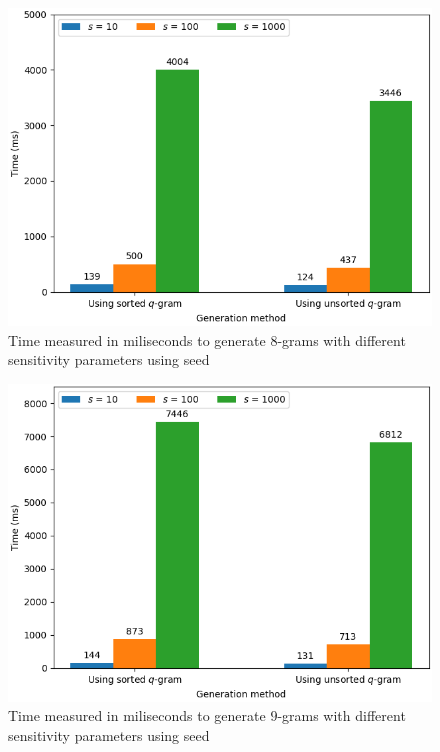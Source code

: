 \documentclass[twoside,a4paper,bsc]{master}
\newcommand{\Qgram}[1]{\(#1\)-gram}
\begin{document}
\begin{figure}
\centering
\includegraphics[scale=0.7]{graphics/gen_w8.png}
\caption{Time measured in miliseconds to generate \Qgram{8}s with
different sensitivity parameters using seed }
\label{fig:speed8}
\end{figure}

\begin{figure}
\centering
\includegraphics[scale=0.7]{graphics/gen_w9.png}
\caption{Time measured in miliseconds to generate \Qgram{9}s with
different sensitivity parameters using seed }
\label{fig:speed9}
\end{figure}
\end{document}
